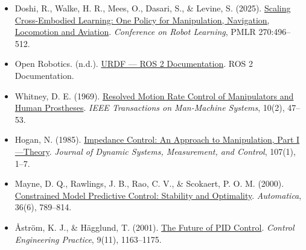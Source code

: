 \begin{itemize}
  Wang, S., Shi, J., Fu, Z., et al.~(2026). \href{https://arxiv.org/abs/2605.12090}{World Action Models: The Next Frontier in Embodied AI}. arXiv:2605.12090.
\item
  Doshi, R., Walke, H. R., Mees, O., Dasari, S., \& Levine, S. (2025). \href{https://proceedings.mlr.press/v270/doshi25a.html}{Scaling Cross-Embodied Learning: One Policy for Manipulation, Navigation, Locomotion and Aviation}. \emph{Conference on Robot Learning}, PMLR 270:496--512.
\item
  Open Robotics. (n.d.). \href{https://docs.ros.org/en/rolling/Tutorials/Intermediate/URDF/URDF-Main.html}{URDF --- ROS 2 Documentation}. ROS 2 Documentation.
\item
  Whitney, D. E. (1969). \href{https://ieeexplore.ieee.org/document/4081862/}{Resolved Motion Rate Control of Manipulators and Human Prostheses}. \emph{IEEE Transactions on Man-Machine Systems}, 10(2), 47--53.
\item
  Hogan, N. (1985). \href{https://doi.org/10.1115/1.3140702}{Impedance Control: An Approach to Manipulation, Part I---Theory}. \emph{Journal of Dynamic Systems, Measurement, and Control}, 107(1), 1--7.
\item
  Mayne, D. Q., Rawlings, J. B., Rao, C. V., \& Scokaert, P. O. M. (2000). \href{https://www.sciencedirect.com/science/article/pii/S0005109899002149}{Constrained Model Predictive Control: Stability and Optimality}. \emph{Automatica}, 36(6), 789--814.
\item
  Åström, K. J., \& Hägglund, T. (2001). \href{https://www.sciencedirect.com/science/article/pii/S0967066101000624}{The Future of PID Control}. \emph{Control Engineering Practice}, 9(11), 1163--1175.
\end{itemize}

\clearpage
